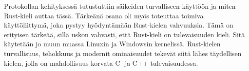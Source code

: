 \documentclass[a4paper,12pt]{article}
\begin{document}
    Protokollan kehityksessä tutustuttiin säikeiden turvalliseen käyttöön ja miten Rust-kieli auttaa tässä. Tärkeänä osana oli myös toteuttaa toimiva käyttöliittymä, joka pystyy hyödyntämään Rust-kielen vahvuuksia. Tämä on erityisen tärkeää, sillä
    uskon vahvasti, että Rust-kieli on tulevaisuuden kieli. Sitä käytetään jo muun muassa Linuxin ja Windowsin kernelissä. Rust-kielen turvallisuus, tehokkuus ja modernit ominaisuudet tekevät siitä lähes täydellisen kielen, jolla on mahdollisuus korvata C- ja C++ tulevaisuudessa.


    \newpage
    
    
\end{document}
